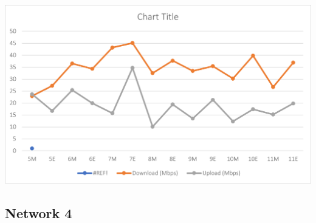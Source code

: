 \documentclass{article}
\begin{document}
\includegraphics[]{prakharbroad.png}
\pagebreak
\subsection{Network 4}

\end{document}
